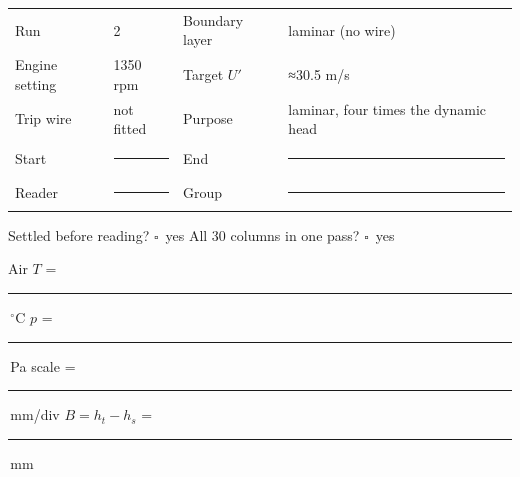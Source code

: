 \documentclass[10pt,a4paper]{article}
\newcommand{\blank}{\rule{1.55cm}{0.4pt}}
\newcommand{\checkbox}{\ensuremath{\square}}
\begin{document}
\begin{tabularx}{\textwidth}{@{}p{3.1cm}p{2.7cm}p{3.0cm}X@{}}
\toprule
Run & 2 & Boundary layer & laminar (no wire) \\
Engine setting & 1350 rpm & Target $U'$ & ≈30.5 m/s \\
Trip wire & not fitted & Purpose & laminar, four times the dynamic head \\
Start & \blank & End & \blank \\
Reader & \blank & Group & \blank \\
\bottomrule
\end{tabularx}

{\small Settled before reading? \checkbox\ yes \qquad All 30 columns in one pass? \checkbox\ yes\par
Air $T$ = \blank\,$^\circ$C \qquad $p$ = \blank\,Pa \qquad
scale = \blank\,mm/div \qquad $B=h_t-h_s$ = \blank\,mm}
\end{document}
